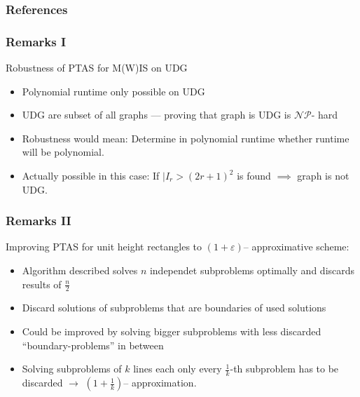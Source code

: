 \documentclass{beamer}
\newcommand{\NP}{\ensuremath{\mathcal{NP}}}
\begin{document}
\begin{frame}[allowframebreaks]\frametitle{References}

\end{frame}

\begin{frame}
\frametitle{Remarks I}
Robustness of PTAS for M(W)IS on UDG
\begin{itemize}
\item<2-> Polynomial runtime only possible on UDG 
\item<3-> UDG are subset of all graphs --- proving that graph is UDG is \NP- hard
\item<4-> Robustness would mean: Determine in polynomial runtime whether runtime will be polynomial. 
\item<5-> Actually possible in this case:  If $|I_r > (2r+1)^2$ is found $\implies$ graph is not UDG.
\end{itemize}
\end{frame}

\begin{frame}
\frametitle{Remarks II}
Improving PTAS for unit height rectangles to {$(1+\varepsilon)$-- approximative} scheme:
\begin{itemize}[<+->]
\item Algorithm described solves $n$ independet subproblems optimally and discards results of $\frac{n}{2}$
\item Discard solutions of subproblems that are boundaries of used solutions
\item Could be improved by solving bigger subproblems with less discarded ``boundary-problems'' in between
\item Solving subproblems of $k$ lines each only every $\frac{1}{k}$-th subproblem has to be discarded $\rightarrow$ $\left(1+\frac{1}{k}\right)$-- approximation.
\end{itemize}
\end{frame}
\end{document}
